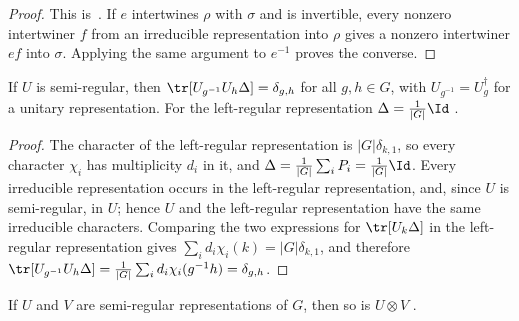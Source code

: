 \begin{proof}\leanok
    This is~\cite[``Semi-regularity under representation
        equivalence'']{QICLean2026Blueprint}.
    If $e$ intertwines $\rho$ with $\sigma$ and is invertible, every
    nonzero intertwiner $f$ from an irreducible representation into
    $\rho$ gives a nonzero intertwiner $ef$ into $\sigma$. Applying the
    same argument to $e^{-1}$ proves the converse.
\end{proof}

\begin{lemma}%
    \label{thm:peps_semiregular_trace}
    \leanok
    If $U$ is semi-regular, then $\tr[U_{g^{-1}}U_h\Delta]=\delta_{g,h}$ for
    all $g,h\in G$, with $U_{g^{-1}}=U_g^\dagger$ for a unitary
    representation. For the left-regular representation
    $\Delta=\frac{1}{|G|}\Id$
    \cite[Section~``MPS: the $G$-injective case'']{Schuch2010PEPS}.
\end{lemma}

\begin{proof}\leanok
    The character of the left-regular representation is $|G|\delta_{k,1}$,
    so every character $\chi_i$ has multiplicity $d_i$ in it, and
    $\Delta=\frac{1}{|G|}\sum_iP_i=\frac{1}{|G|}\Id$. Every
    irreducible representation occurs in the left-regular representation,
    and, since $U$ is semi-regular, in $U$; hence $U$ and the left-regular
    representation have the same irreducible characters. Comparing the two
    expressions for $\tr[U_k\Delta]$ in the left-regular representation gives
    $\sum_id_i\chi_i(k)=|G|\delta_{k,1}$, and therefore
    $\tr[U_{g^{-1}}U_h\Delta]=\frac{1}{|G|}\sum_id_i\chi_i(g^{-1}h)
        =\delta_{g,h}$.
\end{proof}



\begin{lemma}%
    \label{thm:peps_semiregular_tensor_product}
    \leanok
    If $U$ and $V$ are semi-regular representations of $G$, then so is
    $U\otimes V$
    \cite[Section~``Two dimensions: $G$-injective PEPS'']{Schuch2010PEPS}.
\end{lemma}

